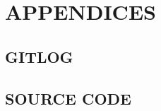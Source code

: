 \documentclass[11pt,a4paper]{article}
\begin{document}
\section{APPENDICES}

\subsection{GITLOG}


\subsection{SOURCE CODE}

\end{document}
